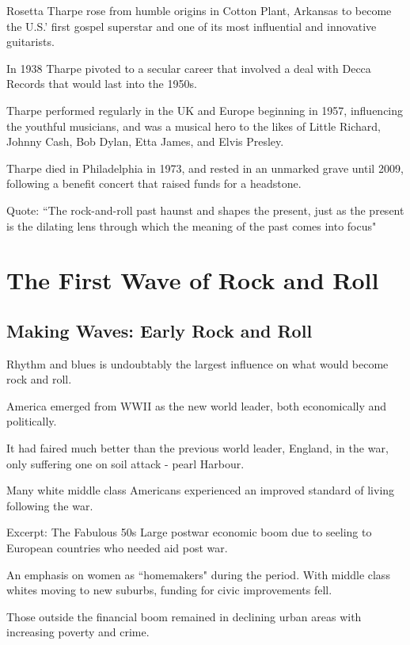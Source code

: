 \documentclass[12pt, a4paper, twoside, openright, titlepage]{book}
\begin{document}
\begin{rmk}{}{}
    Rosetta Tharpe rose from humble origins in Cotton Plant, Arkansas to become the U.S.' first gospel superstar and one of its most influential and innovative guitarists.
\end{rmk}

In 1938 Tharpe pivoted to a secular career that involved a deal with Decca Records that would last into the 1950s. 

Tharpe performed regularly in the UK and Europe beginning in 1957, influencing the youthful musicians, and was a musical hero to the likes of Little Richard, Johnny Cash, Bob Dylan, Etta James, and Elvis Presley. 

Tharpe died in Philadelphia in 1973, and rested in an unmarked grave until 2009, following a benefit concert that raised funds for a headstone.

\begin{rmk}{}{}
    Quote: ``The rock-and-roll past haunst and shapes the present, just as the present is the dilating lens through which the meaning of the past comes into focus"
\end{rmk}




\chapter{The First Wave of Rock and Roll}

\section{Making Waves: Early Rock and Roll}

\begin{rmk}{}{}
    Rhythm and blues is undoubtably the largest influence on what would become rock and roll.
\end{rmk}

\begin{rec}{}{}
    America emerged from WWII as the new world leader, both economically and politically.


    It had faired much better than the previous world leader, England, in the war, only suffering one on soil attack - pearl Harbour.
\end{rec}

Many white middle class Americans experienced an improved standard of living following the war.

\begin{rmk}{Excerpt: The Fabulous 50s}{}
    Large postwar economic boom due to seeling to European countries who needed aid post war.

    An emphasis on women as ``homemakers" during the period. With middle class whites moving to new suburbs, funding for civic improvements fell.

    Those outside the financial boom remained in declining urban areas with increasing poverty and crime.
\end{rmk}
\end{document}
